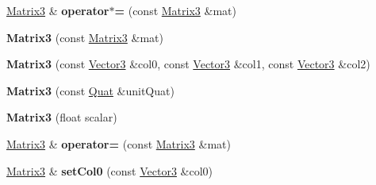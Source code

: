 \begin{DoxyCompactItemize}
\item 
\hypertarget{class_vectormath_1_1_aos_1_1_matrix3_ae38155af0b4076fd7df7a846928d4596}{\hyperlink{class_vectormath_1_1_aos_1_1_matrix3}{Matrix3} \& {\bfseries operator$\ast$=} (const \hyperlink{class_vectormath_1_1_aos_1_1_matrix3}{Matrix3} \&mat)}\label{class_vectormath_1_1_aos_1_1_matrix3_ae38155af0b4076fd7df7a846928d4596}

\item 
\hypertarget{class_vectormath_1_1_aos_1_1_matrix3_ad40ce9469c3eb035e45955e197fb2f69}{{\bfseries Matrix3} (const \hyperlink{class_vectormath_1_1_aos_1_1_matrix3}{Matrix3} \&mat)}\label{class_vectormath_1_1_aos_1_1_matrix3_ad40ce9469c3eb035e45955e197fb2f69}

\item 
\hypertarget{class_vectormath_1_1_aos_1_1_matrix3_a47c615a84dc76eec1c638a6f4641faf3}{{\bfseries Matrix3} (const \hyperlink{class_vectormath_1_1_aos_1_1_vector3}{Vector3} \&col0, const \hyperlink{class_vectormath_1_1_aos_1_1_vector3}{Vector3} \&col1, const \hyperlink{class_vectormath_1_1_aos_1_1_vector3}{Vector3} \&col2)}\label{class_vectormath_1_1_aos_1_1_matrix3_a47c615a84dc76eec1c638a6f4641faf3}

\item 
\hypertarget{class_vectormath_1_1_aos_1_1_matrix3_a255d5b94622e38e8ae4969aacc284dfe}{{\bfseries Matrix3} (const \hyperlink{class_vectormath_1_1_aos_1_1_quat}{Quat} \&unit\+Quat)}\label{class_vectormath_1_1_aos_1_1_matrix3_a255d5b94622e38e8ae4969aacc284dfe}

\item 
\hypertarget{class_vectormath_1_1_aos_1_1_matrix3_a54a63372a7b411ef3133f73dc070c13c}{{\bfseries Matrix3} (float scalar)}\label{class_vectormath_1_1_aos_1_1_matrix3_a54a63372a7b411ef3133f73dc070c13c}

\item 
\hypertarget{class_vectormath_1_1_aos_1_1_matrix3_a48694136c5c7033cf4f8b49fb16e06a3}{\hyperlink{class_vectormath_1_1_aos_1_1_matrix3}{Matrix3} \& {\bfseries operator=} (const \hyperlink{class_vectormath_1_1_aos_1_1_matrix3}{Matrix3} \&mat)}\label{class_vectormath_1_1_aos_1_1_matrix3_a48694136c5c7033cf4f8b49fb16e06a3}

\item 
\hypertarget{class_vectormath_1_1_aos_1_1_matrix3_a0eee935f6ae9d7e2902a03029a6a75b3}{\hyperlink{class_vectormath_1_1_aos_1_1_matrix3}{Matrix3} \& {\bfseries set\+Col0} (const \hyperlink{class_vectormath_1_1_aos_1_1_vector3}{Vector3} \&col0)}\label{class_vectormath_1_1_aos_1_1_matrix3_a0eee935f6ae9d7e2902a03029a6a75b3}


\end{DoxyCompactItemize}
